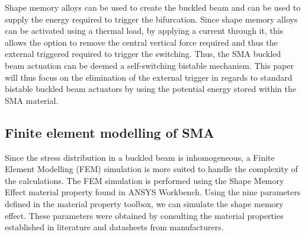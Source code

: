 Shape memory alloys can be used to create the buckled beam and can be used to supply the energy required to trigger the bifurcation. Since shape memory alloys can be activated using a thermal load, by applying a current through it, this allows the option to remove the central vertical force required and thus the external triggered required to trigger the switching. Thus, the SMA buckled beam actuation can be deemed a self-switching bistable mechanism. This paper will thus focus on the elimination of the external trigger in regards to standard bistable buckled beam actuators by using the potential energy stored within the SMA material.

\subsection{Finite element modelling of SMA}
Since the stress distribution in a buckled beam is inhomogeneous, a Finite Element Modelling (FEM) simulation is more suited to handle the complexity of the calculations. The FEM simulation is performed using the Shape Memory Effect material property found in ANSYS Workbench. Using the nine parameters defined in the material property toolbox, we can simulate the shape memory effect. These parameters were obtained by consulting the material properties established in literature and datasheets from manufacturers\cite{divringi_advanced_2009}.

